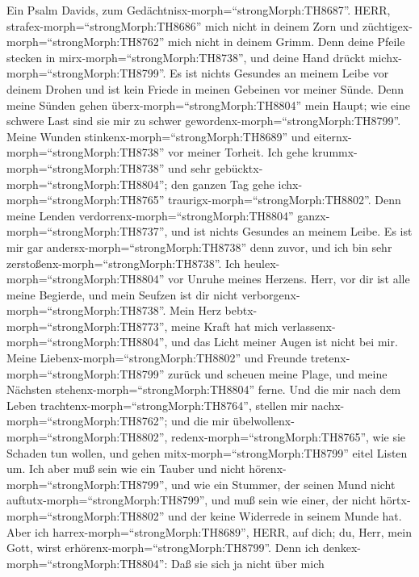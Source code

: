  Ein Psalm Davids, zum
Gedächtnisx-morph=``strongMorph:TH8687''. HERR,
strafex-morph=``strongMorph:TH8686'' mich nicht in deinem Zorn und
züchtigex-morph=``strongMorph:TH8762'' mich nicht in deinem Grimm.
 Denn deine Pfeile stecken in
mirx-morph=``strongMorph:TH8738'', und deine Hand drückt
michx-morph=``strongMorph:TH8799''.  Es ist nichts Gesundes
an meinem Leibe vor deinem Drohen und ist kein Friede in meinen Gebeinen
vor meiner Sünde.  Denn meine Sünden gehen
überx-morph=``strongMorph:TH8804'' mein Haupt; wie eine schwere Last
sind sie mir zu schwer gewordenx-morph=``strongMorph:TH8799''.
 Meine Wunden stinkenx-morph=``strongMorph:TH8689'' und
eiternx-morph=``strongMorph:TH8738'' vor meiner Torheit. 
Ich gehe krummx-morph=``strongMorph:TH8738'' und sehr
gebücktx-morph=``strongMorph:TH8804''; den ganzen Tag gehe
ichx-morph=``strongMorph:TH8765'' traurigx-morph=``strongMorph:TH8802''.
 Denn meine Lenden verdorrenx-morph=``strongMorph:TH8804''
ganzx-morph=``strongMorph:TH8737'', und ist nichts Gesundes an meinem
Leibe.  Es ist mir gar andersx-morph=``strongMorph:TH8738''
denn zuvor, und ich bin sehr zerstoßenx-morph=``strongMorph:TH8738''.
Ich heulex-morph=``strongMorph:TH8804'' vor Unruhe meines Herzens.
 Herr, vor dir ist alle meine Begierde, und mein Seufzen ist
dir nicht verborgenx-morph=``strongMorph:TH8738''.  Mein
Herz bebtx-morph=``strongMorph:TH8773'', meine Kraft hat mich
verlassenx-morph=``strongMorph:TH8804'', und das Licht meiner Augen ist
nicht bei mir.  Meine Liebenx-morph=``strongMorph:TH8802''
und Freunde tretenx-morph=``strongMorph:TH8799'' zurück und scheuen
meine Plage, und meine Nächsten stehenx-morph=``strongMorph:TH8804''
ferne.  Und die mir nach dem Leben
trachtenx-morph=``strongMorph:TH8764'', stellen mir
nachx-morph=``strongMorph:TH8762''; und die mir
übelwollenx-morph=``strongMorph:TH8802'',
redenx-morph=``strongMorph:TH8765'', wie sie Schaden tun wollen, und
gehen mitx-morph=``strongMorph:TH8799'' eitel Listen um. 
Ich aber muß sein wie ein Tauber und nicht
hörenx-morph=``strongMorph:TH8799'', und wie ein Stummer, der seinen
Mund nicht auftutx-morph=``strongMorph:TH8799'',  und muß
sein wie einer, der nicht hörtx-morph=``strongMorph:TH8802'' und der
keine Widerrede in seinem Munde hat.  Aber ich
harrex-morph=``strongMorph:TH8689'', HERR, auf dich; du, Herr, mein
Gott, wirst erhörenx-morph=``strongMorph:TH8799''.  Denn
ich denkex-morph=``strongMorph:TH8804'': Daß sie sich ja nicht über mich
